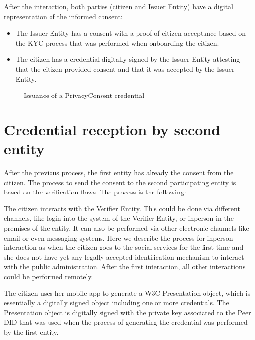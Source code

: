 \documentclass[letterpaper,10pt,english]{sphinxmanual}
\begin{document}
\sphinxAtStartPar
After the interaction, both parties (citizen and Issuer Entity) have a digital representation of the informed consent:
\begin{itemize}
\item {} 
\sphinxAtStartPar
The Issuer Entity has a consent with a proof of citizen acceptance based on the KYC process that was performed when onboarding the citizen.

\item {} 
\sphinxAtStartPar
The citizen has a credential digitally signed by the Issuer Entity attesting that the citizen provided consent and that it was accepted by the Issuer Entity.

\end{itemize}

\begin{figure}[htbp]
\centering
\capstart

\noindent{}
\caption{Issuance of a PrivacyConsent credential}\label{\detokenize{privacycred:id10}}\end{figure}


\section{Credential reception by second entity}
\label{\detokenize{privacycred:credential-reception-by-second-entity}}
\sphinxAtStartPar
After the previous process, the first entity has already the consent from the citizen. The process to send the consent to the second participating entity is based on the verification flows. The process is the following:

\sphinxAtStartPar
The citizen interacts with the Verifier Entity. This could be done via different channels, like login into the system of the Verifier Entity, or in\sphinxhyphen{}person in the premises of the entity. It can also be performed via other electronic channels like email or even messaging systems. Here we describe the process for in\sphinxhyphen{}person interaction as when the citizen goes to the social services for the first time and she does not have yet any legally accepted identification mechanism to interact with the public administration. After the first interaction, all other interactions could be performed remotely.

\sphinxAtStartPar
The citizen uses her mobile app to generate a W3C Presentation object, which is essentially a digitally signed object including one or more credentials. The Presentation object is digitally signed with the private key associated to the Peer DID that was used when the process of generating the credential was performed by the first entity.
\end{document}

